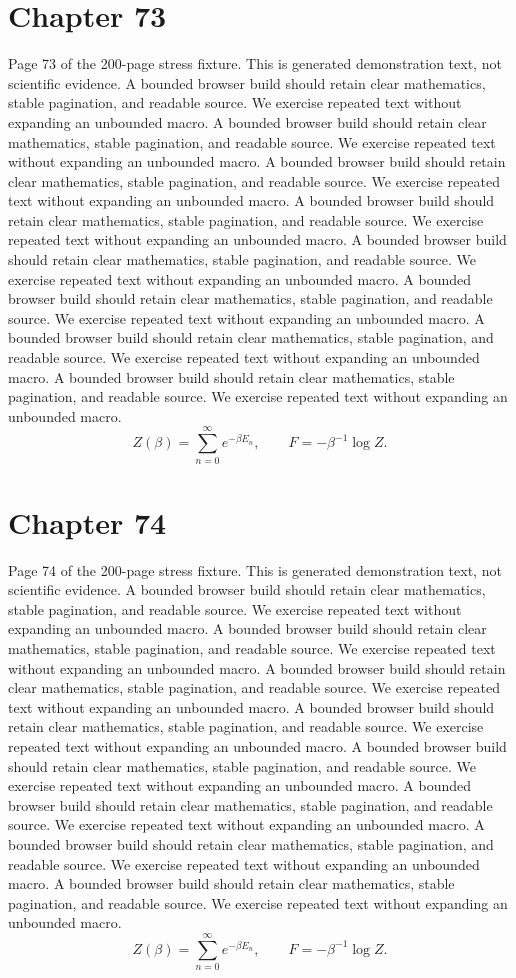 \documentclass[11pt]{article}
\begin{document}
\section*{Chapter 73}
Page 73 of the 200-page stress fixture. This is generated demonstration text, not scientific evidence.
A bounded browser build should retain clear mathematics, stable pagination, and readable source. We exercise repeated text without expanding an unbounded macro.
A bounded browser build should retain clear mathematics, stable pagination, and readable source. We exercise repeated text without expanding an unbounded macro.
A bounded browser build should retain clear mathematics, stable pagination, and readable source. We exercise repeated text without expanding an unbounded macro.
A bounded browser build should retain clear mathematics, stable pagination, and readable source. We exercise repeated text without expanding an unbounded macro.
A bounded browser build should retain clear mathematics, stable pagination, and readable source. We exercise repeated text without expanding an unbounded macro.
A bounded browser build should retain clear mathematics, stable pagination, and readable source. We exercise repeated text without expanding an unbounded macro.
A bounded browser build should retain clear mathematics, stable pagination, and readable source. We exercise repeated text without expanding an unbounded macro.
A bounded browser build should retain clear mathematics, stable pagination, and readable source. We exercise repeated text without expanding an unbounded macro.
\[Z(\beta)=\sum_{n=0}^{\infty}e^{-\beta E_n},\qquad F=-\beta^{-1}\log Z.\]
\newpage
\section*{Chapter 74}
Page 74 of the 200-page stress fixture. This is generated demonstration text, not scientific evidence.
A bounded browser build should retain clear mathematics, stable pagination, and readable source. We exercise repeated text without expanding an unbounded macro.
A bounded browser build should retain clear mathematics, stable pagination, and readable source. We exercise repeated text without expanding an unbounded macro.
A bounded browser build should retain clear mathematics, stable pagination, and readable source. We exercise repeated text without expanding an unbounded macro.
A bounded browser build should retain clear mathematics, stable pagination, and readable source. We exercise repeated text without expanding an unbounded macro.
A bounded browser build should retain clear mathematics, stable pagination, and readable source. We exercise repeated text without expanding an unbounded macro.
A bounded browser build should retain clear mathematics, stable pagination, and readable source. We exercise repeated text without expanding an unbounded macro.
A bounded browser build should retain clear mathematics, stable pagination, and readable source. We exercise repeated text without expanding an unbounded macro.
A bounded browser build should retain clear mathematics, stable pagination, and readable source. We exercise repeated text without expanding an unbounded macro.
\[Z(\beta)=\sum_{n=0}^{\infty}e^{-\beta E_n},\qquad F=-\beta^{-1}\log Z.\]
\newpage
\end{document}
